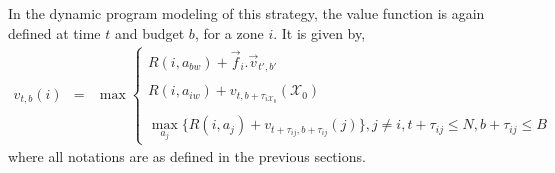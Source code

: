 In the dynamic program modeling of this strategy, the value function is again defined at time $t$ and budget $b$, for a zone $i$. It is given by,
\begin{eqnarray*}
v_{t,b}(i) &=& \max
    \begin{cases}
    R(i, a_{bw}) + \vec{f}_i.\vec{v}_{t',b'} \\ \\
    R(i, a_{iw}) + v_{t,b + \tau_{i\mathcal{X}_0}}(\mathcal{X}_0) \\ \\
    \max_{a_j} \bigg\{R(i,a_j) + v_{t + \tau_{ij}, b + \tau_{ij}}(j)\bigg\}, j \neq i, t + \tau_{ij} \leq N, b + \tau_{ij} \leq B
    \end{cases}
\end{eqnarray*}
where all notations are as defined in the previous sections.




